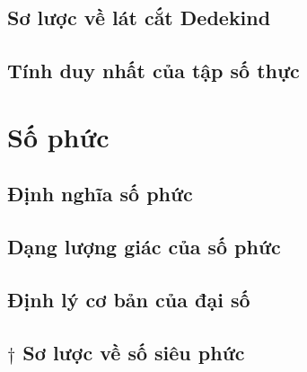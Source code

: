 \subsection{Sơ lược về lát cắt Dedekind}

\subsection{Tính duy nhất của tập số thực}

\section{Số phức}

\subsection{Định nghĩa số phức}

\subsection{Dạng lượng giác của số phức}

\subsection{Định lý cơ bản của đại số}

\subsection{$\dagger$ Sơ lược về số siêu phức}

